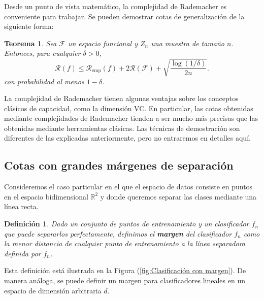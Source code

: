 \documentclass{report}
\newtheorem{thm}{Teorema}[section]
\newtheorem{dfn}{Definición}[section]
\begin{document}
Desde un punto de vista matemático, la complejidad de Rademacher es conveniente para trabajar. Se pueden 
demostrar cotas de generalización de la siguiente forma:
\begin{thm}
    Sea $\mathcal{F}$ un espacio funcional y $Z_n$ una muestra de tamaño $n$. Entonces, para cualquier $\delta > 0$,
\[
\mathcal{R}(f) \leq \mathcal{R}_{\text{emp}}(f) + 2\mathscr{R}(\mathcal{F}) + \sqrt{\frac{\log(1/\delta)}{2n}}.
\]
con probabilidad al menos \(1 - \delta\).\\
\end{thm}

La complejidad de Rademacher tienen algunas ventajas sobre los conceptos clásicos de capacidad, como la 
dimensión VC. En particular, las cotas obtenidas mediante complejidades de Rademacher tienden a ser mucho más 
precisas que las obtenidas mediante herramientas clásicas. Las técnicas de demostración son diferentes de las 
explicadas anteriormente, pero no entraremos en detalles aquí. 

\subsection{Cotas con grandes márgenes de separación}

Consideremos 
el caso particular en el que el espacio de datos consiste en puntos en el espacio bidimensional 
\(\mathbb{R}^2\) y donde queremos separar las clases mediante una línea recta. 

\begin{dfn}
    Dado un conjunto de puntos de entrenamiento y un clasificador \(f_n\) que puede separarlos perfectamente, definimos 
    el \textbf{margen} del clasificador \(f_n\) como la menor distancia de cualquier punto de entrenamiento 
    a la línea separadora definida por \(f_n\).  \label{def:margen} 
\end{dfn}

Esta definición está ilustrada en la Figura (\ref{fig:Clasificación con margen}). 
De manera análoga, se puede definir un margen para clasificadores lineales en un espacio de dimensión arbitraria \(d\).
\end{document}
